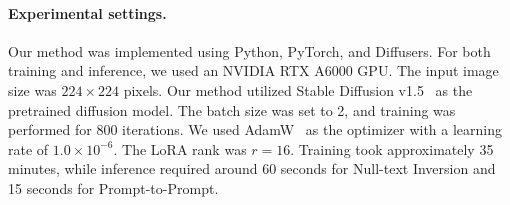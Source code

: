 \begin{table*}[t]
  \centering
  \caption{
  Quantitative comparison of our method with and without our refined regularization set. 
  }
  \label{tab:dexreg}
\end{table*}

\paragraph{Experimental settings. }
Our method was implemented using Python, PyTorch, and Diffusers.
For both training and inference, we used an NVIDIA RTX A6000 GPU.
The input image size was $224\times224$ pixels.
Our method utilized Stable Diffusion v1.5~\cite{rombach2022high} as the pretrained diffusion model. The batch size was set to 2, and training was performed for 800 iterations.
We used AdamW~\cite{loshchilov2017decoupled} as the optimizer with a learning rate of $1.0\times10^{-6}$.
The LoRA rank was $r=16$. 
Training took approximately 35 minutes, while inference required around 60 seconds for Null-text Inversion and 15 seconds for Prompt-to-Prompt.


